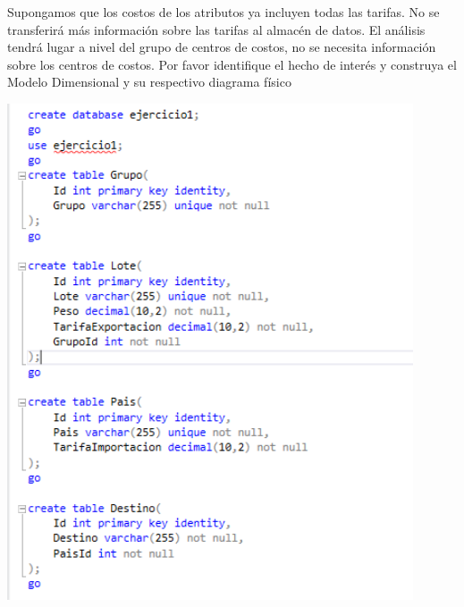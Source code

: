 \item{Supongamos que los costos de los atributos ya incluyen todas las tarifas. No se transferirá más información sobre las tarifas al almacén de datos. El análisis tendrá lugar a nivel del grupo de centros de costos, no se necesita información sobre los centros de costos.
Por favor identifique el hecho de interés y construya el Modelo Dimensional y su respectivo diagrama físico}
\begin{center}
\includegraphics[width=12cm]{./Imagenes/11}
\end{center}

